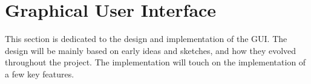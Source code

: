 \section{Graphical User Interface}
\label{sec:gui}

This section is dedicated to the design and implementation of the GUI. The design will be mainly based on early ideas and sketches, and how they evolved throughout the project. The implementation will touch on the implementation of a few key features.


